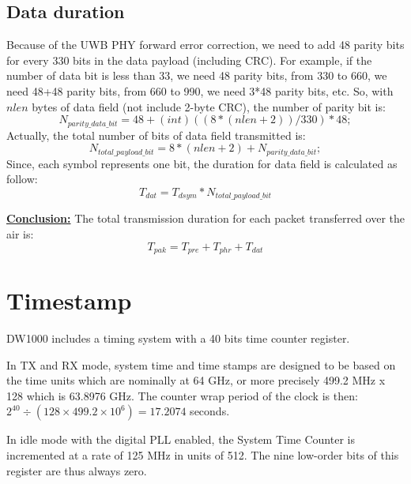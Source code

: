 \documentclass[./main.tex]{subfiles}
\begin{document}
\subsection{Data duration}
Because of the UWB PHY forward error correction, we need to add 48 parity bits for every 330 bits in the data payload (including CRC).
For example, if the number of data bit is less than 33, we need 48 parity bits, from 330 to 660, we need 48+48 parity bits, from 660 to 990, we need 3*48 parity bits, etc. So, with $nlen$ bytes  of data field (not include 2-byte CRC), the number of parity bit is:
\begin{equation}
    N_{parity\_data\_bit} = 48 + (int)((8*(nlen+2))/330) * 48;
\end{equation}
Actually, the total number of bits of data field transmitted is:
\begin{equation}
    N_{total\_payload\_bit} = 8*(nlen+2) + N_{parity\_data\_bit};
\end{equation}
Since, each symbol represents one bit, the duration for data field is calculated as follow:
\begin{equation}
    T_{dat} = T_{dsym} * N_{total\_payload\_bit}
\end{equation}

\underline{\textbf{Conclusion:}}
The total transmission duration for each packet transferred over the air is:
\begin{equation}
    T_{pak} = T_{pre} + T_{phr} + T_{dat}
\end{equation}

\section{Timestamp}

DW1000 includes a timing system with a 40 bits time counter register.

In TX and RX mode, system time and time stamps are designed to be based on the time units which are nominally at 64 GHz, or more precisely 499.2 MHz x 128 which is 63.8976 GHz. The counter wrap period of the clock is then: $2^{40} \div (128 \times 499.2 \times 10^6) = 17.2074$
seconds.

In idle mode with the digital PLL enabled, the System Time Counter is incremented at a rate of 125 MHz in units of 512. The nine low-order bits of this register are thus always zero. 
\end{document}
